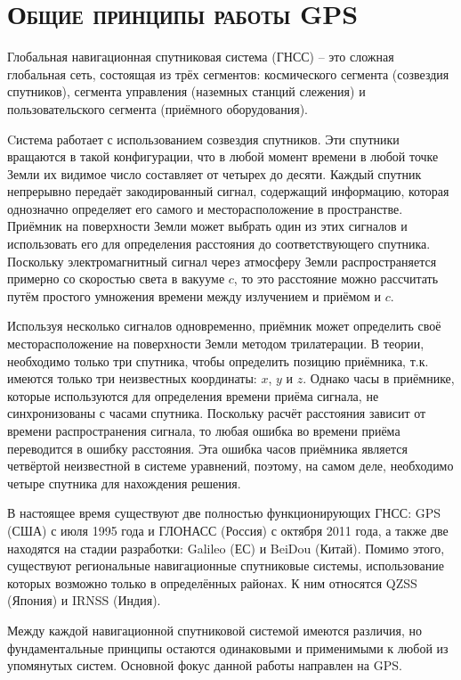 \chapter{\textsc{Общие принципы работы GPS}}

Глобальная навигационная спутниковая система (ГНСС) -- это сложная глобальная сеть, состоящая из трёх сегментов: космического сегмента (созвездия спутников), сегмента управления (наземных станций слежения) и пользовательского сегмента (приёмного оборудования).

Cистема работает с использованием созвездия спутников.  
Эти спутники вращаются в такой конфигурации, что в любой момент времени в любой точке Земли их видимое число составляет от четырех до десяти.
Каждый спутник непрерывно передаёт закодированный сигнал, содержащий информацию, которая однозначно определяет его самого и месторасположение в пространстве. 
Приёмник на поверхности Земли может выбрать один из этих сигналов и использовать его для определения расстояния до соответствующего спутника.  
Поскольку электромагнитный сигнал через атмосферу Земли распространяется примерно со скоростью света в вакууме $c$, то это расстояние можно рассчитать путём простого умножения времени между излучением и приёмом и $c$.

Используя несколько сигналов одновременно, приёмник может определить своё месторасположение на поверхности Земли методом трилатерации.
В теории, необходимо только три спутника, чтобы определить позицию приёмника, т.к. имеются только три неизвестных координаты: $x$, $y$ и $z$.   
Однако часы в приёмнике, которые используются для определения времени приёма сигнала, не синхронизованы с часами спутника.
Поскольку расчёт расстояния зависит от времени распространения сигнала, то любая ошибка во времени приёма переводится в ошибку расстояния.  
Эта ошибка часов приёмника является четвёртой неизвестной в системе уравнений, поэтому, на самом деле, необходимо четыре спутника для нахождения решения.

В настоящее время существуют две полностью функционирующих ГНСС: GPS (США) с июля 1995 года и ГЛОНАСС (Россия) с октября 2011 года, а также две находятся на стадии разработки: Galileo (ЕС) и BeiDou (Китай). 
Помимо этого, существуют региональные навигационные спутниковые системы, использование которых возможно только в определённых районах. 
К ним относятся QZSS (Япония) и IRNSS (Индия).  

Между каждой навигационной спутниковой системой имеются различия, но фундаментальные принципы остаются одинаковыми и применимыми к любой из упомянутых систем.
Основной фокус данной работы направлен на GPS.
